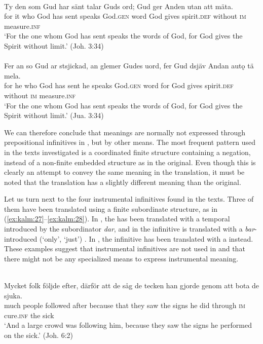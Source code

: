 \documentclass[output=paper]{langscibook}
\begin{document}
\ea
\label{ex:kalm:26}
\ea {}\label{ex:kalm:26a}\\
\gll Ty den som Gud har sänt talar Guds ord; Gud ger Anden utan att mäta.\\
for it who God has sent speaks God.\textsc{gen} word God gives spirit.\textsc{def} without \textsc{im} measure.\textsc{inf}\\
\glt ‘For the one whom God has sent speaks the words of God, for God gives the Spirit without limit.’ (Joh. 3:34)\\

\ex {}\label{ex:kalm:26b}\\
\gll Fer an so Gud ar stsjickad, an glemer Gudes uord, fer Gud dsjäv Andan autǫ tä mela.\\
for he who God has sent he speaks God.\textsc{gen} word for God gives spirit.\textsc{def} without \textsc{im} measure.\textsc{inf}\\
\glt ‘For the one whom God has sent speaks the words of God, for God gives the Spirit without limit.’ (Jua. 3:34)
\z
\z 


We can therefore conclude that  meanings are normally not expressed through prepositional infinitives in , but by other means. The most frequent pattern used in the texts investigated is a coordinated finite structure containing a negation, instead of a non-finite embedded structure as in the  original. Even though this is clearly an attempt to convey the same meaning in the translation, it must be noted that the translation has a slightly different meaning than the  original. 



Let us turn next to the four instrumental infinitives found in the  texts. Three of them have been translated using a finite subordinate structure, as in (\ref{ex:kalm:27}–\ref{ex:kalm:28}). In , the   has been translated with a temporal  introduced by the subordinator \textit{dar}, and in  the infinitive is translated with a \textit{bar}-introduced (‘only’, ‘just’) . In , the infinitive has been translated with a  instead. These examples suggest that instrumental infinitives are not used in  and that there might not be any specialized means to express instrumental meaning. 


\ea
\label{ex:kalm:27}
\ea {}\label{ex:kalm:27a}\\
\gll Mycket folk följde efter, därför att de såg de tecken han gjorde genom att bota de sjuka.\\
 much people followed after because that they saw the signs he did through \textsc{im} cure.\textsc{inf} the sick\\
\glt ‘And a large crowd was following him, because they saw the signs he performed on the sick.’ (Joh. 6:2)\\
\end{document}
